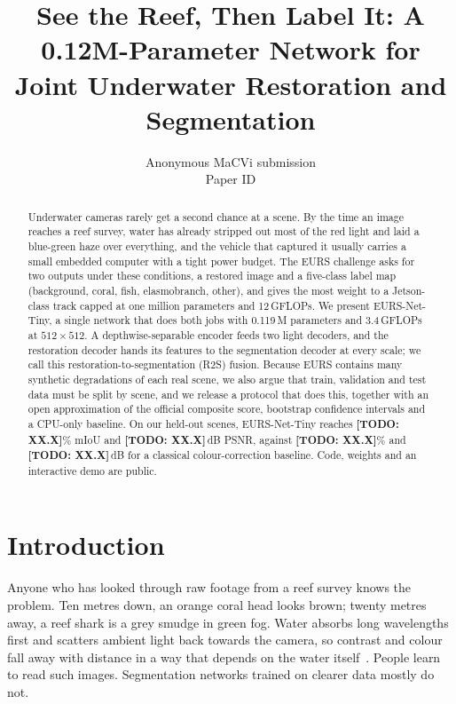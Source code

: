 \documentclass[10pt,twocolumn,letterpaper]{article}
\title{\Large\bf See the Reef, Then Label It: A 0.12M-Parameter Network for\\Joint Underwater Restoration and Segmentation}
\author{Anonymous MaCVi submission\\{\small Paper ID \todo{\#}}}
\date{}
\newcommand{\todo}[1]{{\color{red!75!black}\textbf{[TODO: #1]}}}
\newcommand{\todo}[1]{\errmessage{Unresolved TODO: #1}}
\newcommand{\tinynet}{EURS-Net-Tiny}
\begin{document}
\maketitle

\begin{abstract}
Underwater cameras rarely get a second chance at a scene. By the time an image reaches a reef survey,
water has already stripped out most of the red light and laid a blue-green haze over everything, and the
vehicle that captured it usually carries a small embedded computer with a tight power budget. The EURS
challenge asks for two outputs under these conditions, a restored image and a five-class label map
(background, coral, fish, elasmobranch, other), and gives the most weight to a Jetson-class track capped
at one million parameters and 12\,GFLOPs. We present \tinynet{}, a single network that does both jobs with
0.119\,M parameters and 3.4\,GFLOPs at $512{\times}512$. A depthwise-separable encoder feeds two light
decoders, and the restoration decoder hands its features to the segmentation decoder at every scale; we
call this restoration-to-segmentation (R2S) fusion. Because EURS contains many synthetic degradations of
each real scene, we also argue that train, validation and test data must be split by scene, and we
release a protocol that does this, together with an open approximation of the official composite score,
bootstrap confidence intervals and a CPU-only baseline. On our held-out scenes, \tinynet{} reaches
\todo{XX.X}\% mIoU and \todo{XX.X}\,dB PSNR, against \todo{XX.X}\% and \todo{XX.X}\,dB for a classical
colour-correction baseline. Code, weights and an interactive demo are public.
\end{abstract}

\section{Introduction}
Anyone who has looked through raw footage from a reef survey knows the problem. Ten metres down, an orange
coral head looks brown; twenty metres away, a reef shark is a grey smudge in green fog. Water absorbs long
wavelengths first and scatters ambient light back towards the camera, so contrast and colour fall away
with distance in a way that depends on the water itself~\cite{jaffe1990computer,mcglamery1980computer,akkaynak2018revised}.
People learn to read such images. Segmentation networks trained on clearer data mostly do not.
\end{document}
